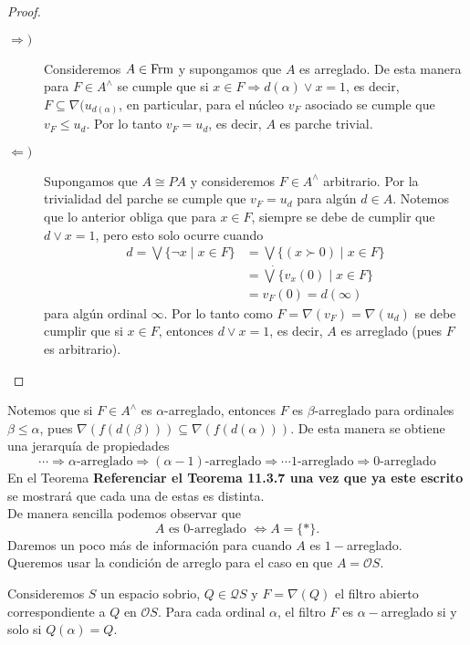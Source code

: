\begin{proof}
    \begin{description}
        \item[$\Rightarrow )$] Consideremos $A\in \mathrm{Frm}$ y supongamos que $A$ es arreglado. De esta manera para $F\in A^\wedge$ se cumple que si $x\in F\Rightarrow d(\alpha)\vee x=1$, es decir, $F\subseteq \nabla(u_{d(\alpha)}$, en particular, para el núcleo $v_F$ asociado se cumple que $v_F\leq u_d$. Por lo tanto $v_F=u_d$, es decir, $A$ es parche trivial.

        \item[$\Leftarrow )$] Supongamos que $A\cong PA$ y consideremos $F\in A^\wedge$ arbitrario. Por la trivialidad del parche se cumple que $v_F=u_d$ para algún $d\in A$. Notemos que lo anterior obliga que para $x\in F$, siempre se debe de cumplir que $d\vee x=1$, pero esto solo ocurre cuando 
        \[
        \begin{split}
        d=\bigvee \{\neg x\mid x\in F\}&=\bigvee\{(x\succ 0)\mid x\in F\}\\
        &=\dot{\bigvee}\{v_x(0)\mid x\in F\}\\
        &=v_F(0)=d(\infty)
        \end{split}
        \]
        para algún ordinal $\infty$. Por lo tanto como $F=\nabla(v_F)=\nabla(u_d)$ se debe cumplir que si $x\in F$, entonces $d\vee x=1$, es decir, $A$ es arreglado (pues $F$ es arbitrario). 
    \end{description}
\end{proof}

Notemos que si $F\in A^\wedge$ es $\alpha$-arreglado, entonces $F$ es $\beta$-arreglado para ordinales $\beta\leq \alpha$, pues $\nabla(f(d(\beta)))\subseteq \nabla(f(d(\alpha)))$. De esta manera se obtiene una jerarquía de propiedades
\[
\cdots \Rightarrow \alpha\mbox{-arreglado}\Rightarrow (\alpha-1)\mbox{-arreglado}\Rightarrow \cdots 1\mbox{-arreglado}\Rightarrow 0\mbox{-arreglado}
\]
En el Teorema \textbf{Referenciar el Teorema 11.3.7 una vez que ya este escrito} se mostrará que cada una de estas es distinta.\\

De manera sencilla podemos observar que
\[
A \mbox{ es } 0\mbox{-arreglado }\Leftrightarrow A=\{*\}.
\]
Daremos un poco más de información para cuando $A$ es $1-$arreglado.\\

Queremos usar la condición de arreglo para el caso en que $A=\mathcal{O}S$.

\begin{lem}\label{Lema8.2.3}
    Consideremos $S$ un espacio sobrio, $Q\in \mathcal{Q}S$ y $F=\nabla(Q)$ el filtro abierto correspondiente a $Q$ en $\mathcal{O}S$. Para cada ordinal $\alpha$, el filtro $F$ es $\alpha-$arreglado si y solo si $Q(\alpha)=Q$.
\end{lem}


